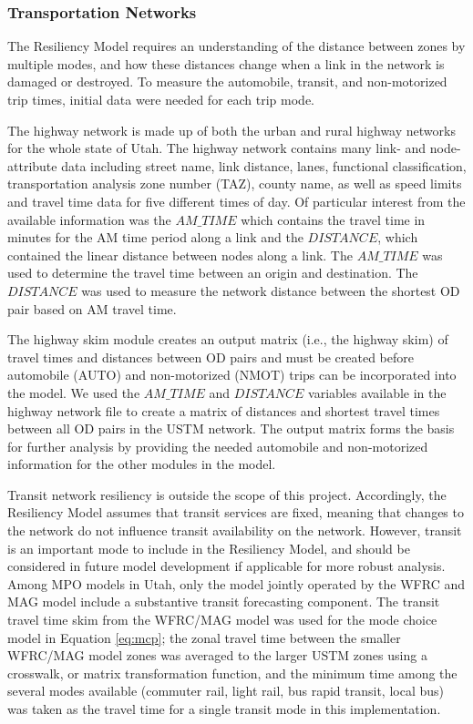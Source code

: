 \subsubsection{Transportation Networks}

The Resiliency Model requires an understanding of the distance between zones by multiple modes, and how
these distances change when a link in the network is damaged or destroyed. To measure the
automobile, transit, and non-motorized trip times, initial data were needed for each trip mode.

The highway network is made up of both the urban and rural highway networks
for the whole state of Utah. The highway network contains many link- and
node-attribute data including street name, link distance, lanes, functional
classification, transportation analysis zone number (TAZ), county name,
as well as speed limits and travel time data for five different times of day.
Of particular interest from the available information was the \(AM\_TIME\) which
contains the travel time in minutes for the AM time period along a link and
the \(DISTANCE\), which contained the linear distance between nodes along a link.
The \(AM\_TIME\) was used to determine the travel time between an origin and
destination. The \(DISTANCE\) was used to measure the network distance between
the shortest OD pair based on AM travel time.

The highway skim module creates an output matrix (i.e., the highway skim) of travel
times and distances between OD pairs and must be created
before automobile (AUTO) and non-motorized (NMOT) trips can be incorporated
into the model. We used the \(AM\_TIME\) and \(DISTANCE\) variables available in
the highway network file to create a matrix of distances and shortest travel
times between all OD pairs in the USTM network. The output matrix forms the
basis for further analysis by providing the needed automobile and non-motorized
information for the other modules in the model.

Transit network resiliency is outside the scope of this project. Accordingly, the Resiliency
Model assumes that transit services are fixed, meaning that changes to the
network do not influence transit availability on the network. However, transit
is an important mode to include in the Resiliency Model, and  should be
considered in future model development if applicable for more robust analysis.
Among MPO models in Utah, only the model jointly operated by the WFRC and MAG model include a
substantive transit forecasting component. The transit travel time skim from the
WFRC/MAG model was used for the mode choice model in Equation \eqref{eq:mcp};
the zonal travel time between the smaller WFRC/MAG model zones was averaged
to the larger USTM zones using a crosswalk, or matrix transformation function, and the minimum time among the several modes available
(commuter rail, light rail, bus rapid transit, local bus) was taken as the travel
time for a single transit mode in this implementation.

